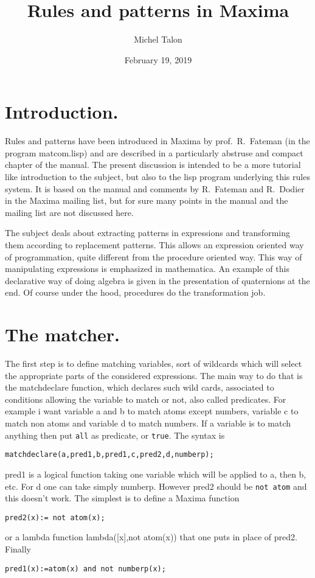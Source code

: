 \documentclass[a4paper,11pt]{article}
\title{Rules and patterns in Maxima}
\author{Michel Talon}
\date{February 19, 2019}
\begin{document}
\maketitle
\section{Introduction.}


Rules and patterns have been introduced in Maxima by prof.\ R.\ Fateman
(in the program matcom.lisp) and are described in a particularly
abstruse and compact chapter of the manual. The present discussion is
intended to be a more tutorial like introduction to the subject, but
also to the lisp program underlying this rules system. It is based on
the manual and comments by R.\ Fateman and R.\ Dodier in the Maxima
mailing list, but for sure many points in the manual and the mailing
list are not discussed here.

The subject deals about extracting patterns in expressions and
transforming them according to replacement patterns.  This allows an
expression oriented way of programmation, quite different from the
procedure oriented way. This way of manipulating expressions is
emphasized in mathematica. An example of this declarative way of doing
algebra is given in the presentation of quaternions at the end.  Of
course under the hood, procedures do the transformation job.

\section{The matcher.}

The first step is to define matching variables, sort of wildcards
which will select the appropriate parts of the considered
expressions. The main way to do that is the matchdeclare function,
which declares such wild cards, associated to conditions allowing the
variable to match or not, also called predicates. For example i want
variable a and b to match atoms except numbers, variable c to match non
atoms and variable d to match numbers.  If a variable is to match
anything then put {\tt all} as predicate, or {\tt true}. The syntax is
\begin{verbatim}
matchdeclare(a,pred1,b,pred1,c,pred2,d,numberp);
\end{verbatim}
pred1 is a logical function taking one variable which will be applied
to a, then b, etc. For d  one can take simply numberp. However pred2 should
be {\tt not atom} and this doesn't work. The simplest is to define a
Maxima function 
\begin{verbatim}
pred2(x):= not atom(x);
\end{verbatim}
or a lambda function 
lambda([x],not atom(x)) that one puts in place of pred2. Finally
\begin{verbatim}
pred1(x):=atom(x) and not numberp(x);
\end{verbatim}
\end{document}
